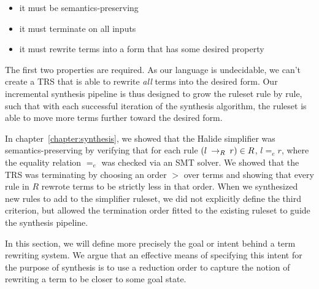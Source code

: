 \begin{itemize}
    \item it must be semantics-preserving
    \item it must terminate on all inputs
    \item it must rewrite terms into a form that has some desired property
\end{itemize}

The first two properties are required. As our language is undecidable, we can't create a TRS that is able to rewrite \emph{all} terms into the desired form. Our incremental synthesis pipeline is thus designed to grow the ruleset rule by rule, such that with each successful iteration of the synthesis algorithm, the ruleset is able to move more terms further toward the desired form.

In chapter~\ref{chapter:synthesis}, we showed that the Halide simplifier was semantics-preserving by verifying that for each rule $(l \:\rightarrow_{R}\: r) \in R$, $l =_e r$, where the equality relation $=_e$ was checked via an SMT solver. We showed that the TRS was terminating by choosing an order $>$ over terms and showing that every rule in $R$ rewrote terms to be strictly less in that order. When we synthesized new rules to add to the simplifier ruleset, we did not explicitly define the third criterion, but allowed the termination order fitted to the existing ruleset to guide the synthesis pipeline. 

In this section, we will define more precisely the goal or intent behind a term rewriting system. We argue that an effective means of specifying this intent for the purpose of synthesis is to use a reduction order to capture the notion of rewriting a term to be closer to some goal state.

